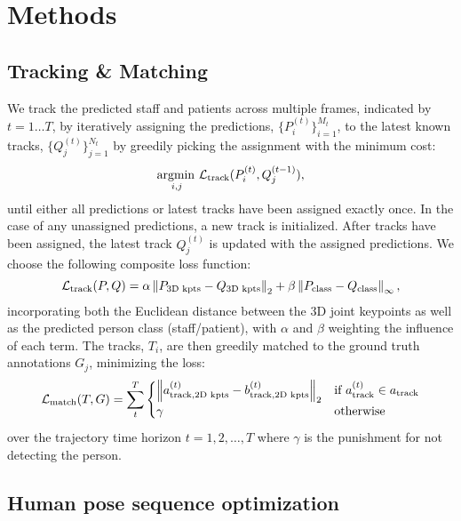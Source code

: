 \chapter{Methods}

\section{Tracking \& Matching}
We track the predicted staff and patients across multiple frames, indicated by $t = 1 \ldots T$, by iteratively assigning the predictions, $\{ P_i^{(t)} \}_{i=1}^{M_t}$, to the latest known tracks, $\{ Q^{(t)}_{j} \}_{j=1}^{N_t}$ by greedily picking the assignment with the minimum cost:
\begin{equation}
    \operatorname*{argmin\,}_{i,j} \mathcal{L}_\text{track}(P^{(t)}_i, Q^{(t-1)}_j),
\end{equation}
until either all predictions or latest tracks have been assigned exactly once. In the case of any unassigned predictions, a new track is initialized. After tracks have been assigned, the latest track $Q^{(t)}_j$ is updated with the assigned predictions. We choose the following composite loss function:
\begin{equation}
    \mathcal{L}_\text{track}(P, Q) = \alpha \left \lVert P_\text{3D kpts} - Q_\text{3D kpts} \right \rVert_{2} + \beta \left \lVert P_\text{class} - Q_\text{class} \right \rVert_{\infty},
\end{equation}
incorporating both the Euclidean distance between the 3D joint keypoints as well as the predicted person class (staff/patient), with $\alpha$ and $\beta$ weighting the influence of each term. The tracks, $T_i$, are then greedily matched to the ground truth annotations $G_j$, minimizing the loss:
\begin{equation}
    \mathcal{L}_\text{match}(T, G) = \sum_t^{T} \begin{cases}
        \norm{a^{(t)}_{\text{track}, \text{2D kpts}} - b^{(t)}_{\text{track}, \text{2D kpts}}}{2} & \text{if}\ a^{(t)}_\text{track} \in a_\text{track} \\
        \gamma & \text{otherwise}
    \end{cases}
\end{equation}
over the trajectory time horizon $t = 1,2,\ldots,T$ where $\gamma$ is the punishment for not detecting the person.

\section{Human pose sequence optimization}


